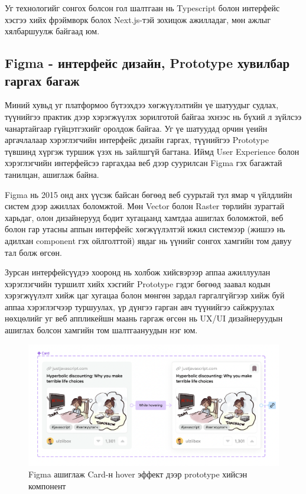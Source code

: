 Уг технологийг сонгох болсон гол шалтгаан нь Typescript болон интерфейс хэсгээ хийх фрэймворк болох Next.js-тэй зохицож ажилладаг, мөн ажлыг хялбаршуулж байгаад юм.

\subsection{Figma - интерфейс дизайн, Prototype хувилбар гаргах багаж}

Миний хувьд уг платформоо бүтээхдээ хөгжүүлэлтийн үе шатуудыг судлах, түүнийгээ практик дээр хэрэгжүүлэх зорилготой байгаа эхнээс нь бүхий л зүйлсээ чанартайгаар гүйцэтгэхийг оролдож байгаа. Уг үе шатуудад орчин үеийн аргачлалаар хэрэглэгчийн интерфейс дизайн гаргах, түүнийгээ Prototype түвшинд хүргэж туршиж үзэх нь зайлшгүй багтана. Иймд User Experience болон хэрэглэгчийн интерфейсээ гаргахдаа веб дээр суурилсан Figma гэх багажтай танилцан, ашиглаж байна. 

Figma нь 2015 онд анх үүсэж байсан бөгөөд веб суурьтай тул ямар ч үйлдлийн систем дээр ажиллах боломжтой. Мөн Vector болон Raster төрлийн зурагтай харьдаг, олон дизайнерууд бодит хугацаанд хамтдаа ашиглах боломжтой, веб болон гар утасны аппын интерфейс хөгжүүлэлтэй ижил системээр (жишээ нь адилхан component гэх ойлголттой) явдаг нь үүнийг сонгох хамгийн том давуу тал болж өгсөн.

Зурсан интерфейсүүдээ хооронд нь холбож хийсвэрээр аппаа ажиллуулан хэрэглэгчийн туршилт хийх хэсгийг Prototype гэдэг бөгөөд заавал кодын хэрэгжүүлэлт хийж цаг хугацаа болон мөнгөн зардал гаргалгүйгээр хийж буй аппаа хэрэглэгчээр туршуулах, үр дүнгээ гарган авч түүнийгээ сайжруулах нөхцөлийг уг веб аппликейшн маань гаргаж өгсөн нь UX/UI дизайнеруудын ашиглах болсон хамгийн том шалтгаануудын нэг юм. 

\begin{figure}[h]
	\centering
	\includegraphics[width=15cm]{images/figma-prototype.png}
	\caption{Figma ашиглаж Card-н hover эффект дээр prototype хийсэн компонент}
	\label{fig:figma}
\end{figure}


